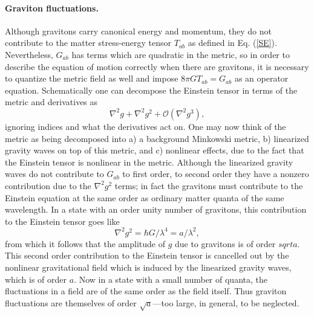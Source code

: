 \documentclass[12pt]{article}
\begin{document}
\paragraph{\textbf{Graviton fluctuations.}}  Although gravitons carry canonical energy and momentum, they do not contribute to the matter stress-energy tensor $T_{ab}$ as defined in Eq. (\ref{SE}).  Nevertheless, $G_{ab}$ has terms which are quadratic in the metric, so in order to describe the equation of motion correctly when there are gravitons, it is necessary to quantize the metric field as well and impose $8\pi G T_{ab} = G_{ab}$ as an operator equation.  Schematically one can decompose the Einstein tensor in terms of the metric and derivatives as
\begin{equation}
\nabla^2 g + \nabla^2 g^2 + \mathcal{O}(\nabla^2 g^3),
\end{equation}
ignoring indices and what the derivatives act on.  One may now think of the metric as being decomposed into a) a background Minkowski metric, b) linearized gravity waves on top of this metric, and c) nonlinear effects, due to the fact that the Einstein tensor is nonlinear in the metric.  Although the linearized gravity waves do not contribute to $G_{ab}$ to first order, to second order they have a nonzero contribution due to the $\nabla^2 g^2$ terms; in fact the gravitons must contribute to the Einstein equation at the same order as ordinary matter quanta of the same wavelength.  In a state with an order unity number of gravitons, this contribution to the Einstein tensor goes like
\begin{equation}
\nabla^2 g^2 = \hbar G / \lambda^4 = a / \lambda^2,
\end{equation}
from which it follows that the amplitude of $g$ due to gravitons is of order $sqrt{a}$.  This second order contribution to the Einstein tensor is cancelled out by the nonlinear gravitational field which is induced by the linearized gravity waves, which is of order $a$.  Now in a state with a small number of quanta, the fluctuations in a field are of the same order as the field itself.  Thus graviton fluctuations are themselves of order $\sqrt{a}$---too large, in general, to be neglected.
\end{document}
